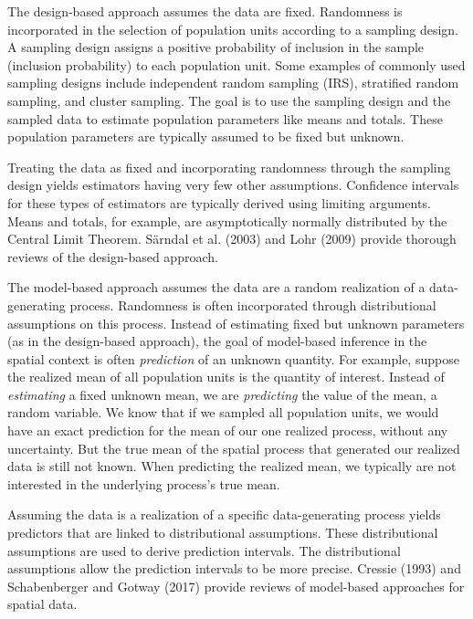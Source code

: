 \documentclass[]{elsarticle} %
\begin{document}
The design-based approach assumes the data are fixed. Randomness is
incorporated in the selection of population units according to a
sampling design. A sampling design assigns a positive probability of
inclusion in the sample (inclusion probability) to each population unit.
Some examples of commonly used sampling designs include independent
random sampling (IRS), stratified random sampling, and cluster sampling.
The goal is to use the sampling design and the sampled data to estimate
population parameters like means and totals. These population parameters
are typically assumed to be fixed but unknown.

Treating the data as fixed and incorporating randomness through the
sampling design yields estimators having very few other assumptions.
Confidence intervals for these types of estimators are typically derived
using limiting arguments. Means and totals, for example, are
asymptotically normally distributed by the Central Limit Theorem.
Särndal et al. (2003) and Lohr (2009) provide thorough reviews of the
design-based approach.

The model-based approach assumes the data are a random realization of a
data-generating process. Randomness is often incorporated through
distributional assumptions on this process. Instead of estimating fixed
but unknown parameters (as in the design-based approach), the goal of
model-based inference in the spatial context is often \emph{prediction}
of an unknown quantity. For example, suppose the realized mean of all
population units is the quantity of interest. Instead of
\emph{estimating} a fixed unknown mean, we are \emph{predicting} the
value of the mean, a random variable. We know that if we sampled all
population units, we would have an exact prediction for the mean of our
one realized process, without any uncertainty. But the true mean of the
spatial process that generated our realized data is still not known.
When predicting the realized mean, we typically are not interested in
the underlying process's true mean.

Assuming the data is a realization of a specific data-generating process
yields predictors that are linked to distributional assumptions. These
distributional assumptions are used to derive prediction intervals. The
distributional assumptions allow the prediction intervals to be more
precise. Cressie (1993) and Schabenberger and Gotway (2017) provide
reviews of model-based approaches for spatial data.
\end{document}
